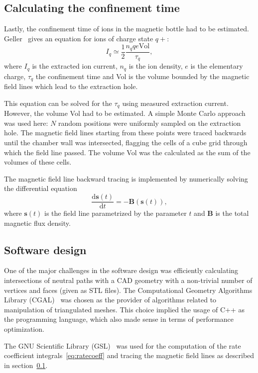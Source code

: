 \documentclass[a4paper,twoside,12pt]{article}
\begin{document}
\subsection{Calculating the confinement time}
\label{sec:confinement}
Lastly, the confinement time of ions in the magnetic bottle had to be estimated. Geller~\cite{geller:ecr} gives an equation for ions of charge state $q+$:
\begin{equation}
    \label{eq:confinement_time}
    I_q \simeq \frac{1}{2} \frac{n_q q e \mathrm{Vol}}{\tau_q},
\end{equation}
where $I_q$ is the extracted ion current, $n_q$ is the ion density, $e$ is the elementary charge, $\tau_q$ the confinement time and Vol is the volume bounded by the magnetic field lines which lead to the extraction hole.

This equation can be solved for the $\tau_q$ using measured extraction current. However, the volume Vol had to be estimated. A simple Monte Carlo approach was used here: $N$ random positions were uniformly sampled on the extraction hole. The magnetic field lines starting from these points were traced backwards until the chamber wall was intersected, flagging the cells of a cube grid through which the field line passed. The volume Vol was the calculated as the sum of the volumes of these cells.

The magnetic field line backward tracing is implemented by numerically solving the differential equation
\begin{equation}
    \frac{\mathrm{d}\mathbf{s}(t)}{\mathrm{d}t} = -\mathbf{B}(\mathbf{s}(t)),
\end{equation}
where $\mathbf{s}(t)$ is the field line parametrized by the parameter $t$ and $\mathbf{B}$ is the total magnetic flux density.

\subsection{Software design}
One of the major challenges in the software design was efficiently calculating intersections of neutral paths with a CAD geometry with a non-trivial number of vertices and faces (given as STL files). The Computational Geometry Algorithms Library (\textsc{CGAL})~\cite{cgal} was chosen as the provider of algorithms related to manipulation of triangulated meshes. This choice implied the usage of \textsc{C++} as the programming language, which also made sense in terms of performance optimization.

The GNU Scientific Library (\textsc{GSL})~\cite{gsl} was used for the computation of the rate coefficient integrals~\eqref{eq:ratecoeff} and tracing the magnetic field lines as described in section~\ref{sec:confinement}.
\end{document}
